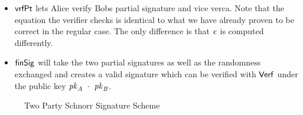 \begin{definition}
\begin{itemize}
        \item $\mathsf{vrfPt}$ lets Alice verify Bobs partial signature and vice verca. Note that the equation the verifier checks is identical to what we have already proven to be correct in the regular
        case. The only difference is that $\mathit{e}$ is computed differently.
        \item $\mathsf{finSig}$ will take the two partial signatures as well as the randomness exchanged and creates a valid signature which can be verified with $\mathsf{Verf}$ under the public key
        $\mathit{pk}_{\mathit{A}} ~\cdot~ \mathit{pk}_{\mathit{B}}$.
    \end{itemize}
\end{definition}

\begin{figure}
    \fbox{
        \parbox{\textwidth}{
            \procedure[linenumbering, syntaxhighlight=auto]{$\procSetupPartSig{\varSecParam}$}{
                \varNonce \sample \cnstIntegersPrimeWithoutZero{\varPrime} \\
                \varRand \opAssign \funGen{\varRand} \\
                \pcreturn (\varNonce \opSeperate \varRand)
            }
            \procedure[linenumbering, syntaxhighlight=auto]{$\procGenPartSig{\varMsg}{\varSecKeyAlice}{\varNonceAlice}{\varPubKeyBob}{\varRandBob}$} {
                \varSchnorrChallenge \opAssign \funHash{\varMsg \opConc \varRandAlice \opAddPoint \varRandBob \opConc \varPubKeyAlice \opAddPoint \varPubKeyBob} \\
                \varS \opAssign \varNonceAlice \opAddScalar \varSchnorrChallenge \opTimesScalar \varSecKeyAlice \\
                \pcreturn \varSigAlice \opAssign \varS
            } \\[2\baselineskip]
            \procedure[linenumbering, syntaxhighlight=auto]{$\procVerfPartSig{\varMsg}{\varSecKeyAlice}{\varNonceAlice}{\varPubKeyBob}{\varRandBob}{\varSigBob}$} {
                \varSchnorrChallenge \opAssign \funHash{\varMsg \opConc \varRandAlice \opAddPoint \varRandBob \opConc \varPubKeyAlice \opAddPoint \varPubKeyBob} \\
                \varS \opAssign \opAccess{\varSigBob}{\varS} \\
                \pcreturn \funGen{\varS} \opEq \opPointScalar{\varRandBob}{\varSchnorrChallenge} \opAddPoint \varPubKeyBob
            } \\[2\baselineskip]
            \procedure[linenumbering, syntaxhighlight=auto]{$\procFinSig{\varSigAlice}{\varSigBob}{\varRandAlice}{\varRandBob}$} {
                \varS_\varAlice \opAssign \opAccess{\varSigAlice}{\varS} \\
                \varS_\varBob \opAssign \opAccess{\varSigBob}{\varS} \\
                \pcreturn \varSigFin \opAssign (\varS \opAssign \varS_\varAlice \opAddScalar \varS_\varBob \opSeperate \varRand \opAssign \varRandAlice \opAddPoint \varRandBob)
            }
        }
    }
    \caption{Two Party Schnorr Signature Scheme}
    \label{fig:twoparty-schnorr}
\end{figure}

